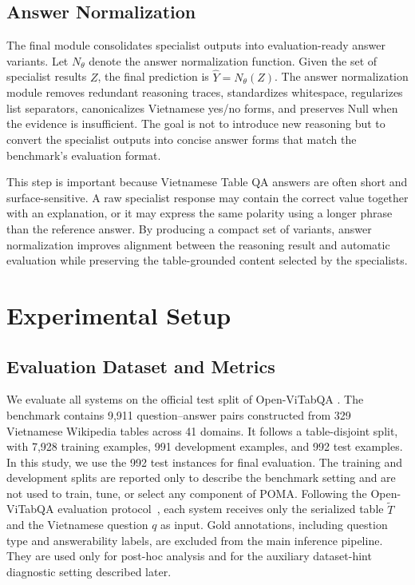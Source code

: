 \documentclass[]{interact}
\begin{document}
\subsection{Answer Normalization}

The final module consolidates specialist outputs into evaluation-ready answer variants. Let $N_{\theta}$ denote the answer normalization function. Given the set of specialist results $Z$, the final prediction is $\hat{Y}=N_{\theta}(Z)$. The answer normalization module removes redundant reasoning traces, standardizes whitespace, regularizes list separators, canonicalizes Vietnamese yes/no forms, and preserves Null when the evidence is insufficient. The goal is not to introduce new reasoning but to convert the specialist outputs into concise answer forms that match the benchmark's evaluation format.

This step is important because Vietnamese Table QA answers are often short and surface-sensitive. A raw specialist response may contain the correct value together with an explanation, or it may express the same polarity using a longer phrase than the reference answer. By producing a compact set of variants, answer normalization improves alignment between the reasoning result and automatic evaluation while preserving the table-grounded content selected by the specialists.


\section{Experimental Setup}\label{sec:setup}

\subsection{Evaluation Dataset and Metrics}

We evaluate all systems on the official test split of Open-ViTabQA \citep{openvitabqa2025}. The benchmark contains 9,911 question--answer pairs constructed from 329 Vietnamese Wikipedia tables across 41 domains. It follows a table-disjoint split, with 7,928 training examples, 991 development examples, and 992 test examples. In this study, we use the 992 test instances for final evaluation. The training and development splits are reported only to describe the benchmark setting and are not used to train, tune, or select any component of POMA. Following the Open-ViTabQA evaluation protocol~\citep{openvitabqa2025}, each system receives only the serialized table $\tilde{T}$ and the Vietnamese question $q$ as input. Gold annotations, including question type and answerability labels, are excluded from the main inference pipeline. They are used only for post-hoc analysis and for the auxiliary dataset-hint diagnostic setting described later.
\end{document}
